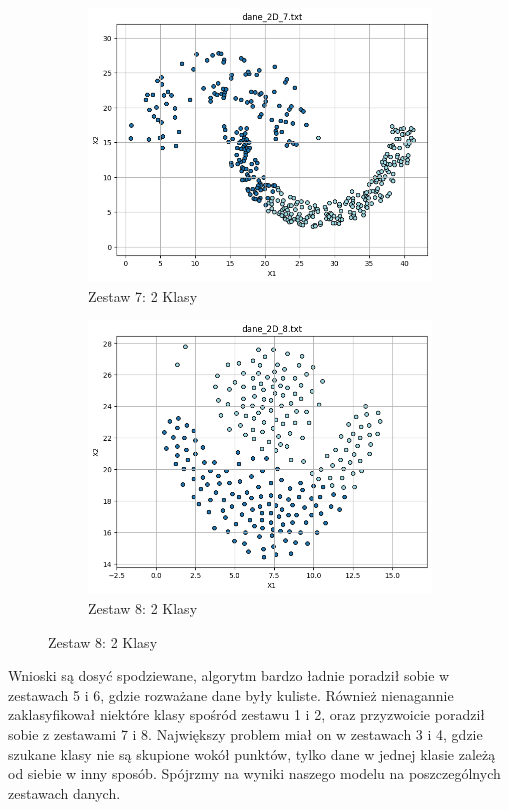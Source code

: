 \documentclass[polish,12pt,a4paper]{extarticle}
\begin{document}
\begin{figure}[h!]
\begin{subfigure}[b]{0.30\textwidth}
        \includegraphics[width=\linewidth]{img/kmeans2D/data7.png}
        \captionsetup{labelformat=empty}
        \caption{Zestaw 7: 2 Klasy}
    \end{subfigure}
    \begin{subfigure}[b]{0.30\textwidth}
        \includegraphics[width=\linewidth]{img/kmeans2D/data8.png}
        \captionsetup{labelformat=empty}
        \caption{Zestaw 8: 2 Klasy}
    \end{subfigure}
    \label{fig:data_grid}
\end{figure}

\noindent Wnioski są dosyć spodziewane, algorytm bardzo ładnie poradził sobie  w zestawach 5 i 6, gdzie rozważane dane były kuliste. Również nienagannie zaklasyfikował niektóre klasy spośród zestawu 1 i 2, oraz przyzwoicie poradził sobie z zestawami 7 i 8. Największy problem miał on w zestawach 3 i 4, gdzie szukane klasy nie są skupione wokół punktów, tylko dane w jednej klasie zależą od siebie w inny sposób. Spójrzmy na wyniki naszego modelu na poszczególnych zestawach danych.\\
\end{document}
